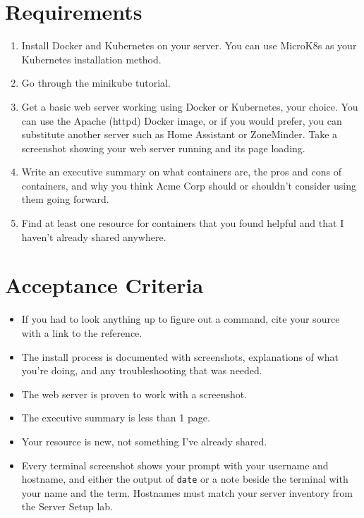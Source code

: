 \documentclass[12pt]{article}
\begin{document}
\section*{Requirements}
\begin{enumerate}
    \item Install Docker and Kubernetes on your server. You can use MicroK8s as your Kubernetes installation method.
    \item Go through the minikube tutorial.
    \item Get a basic web server working using Docker or Kubernetes, your choice. You can use the Apache (httpd) Docker image, or if you would prefer, you can substitute another server such as Home Assistant or ZoneMinder. Take a screenshot showing your web server running and its page loading.
    \item Write an executive summary on what containers are, the pros and cons of containers, and why you think Acme Corp should or shouldn't consider using them going forward.
    \item Find at least one resource for containers that you found helpful and that I haven't already shared anywhere.
\end{enumerate}

\section*{Acceptance Criteria}
\begin{itemize}
    \item If you had to look anything up to figure out a command, cite your source with a link to the reference.
    \item The install process is documented with screenshots, explanations of what you're doing, and any troubleshooting that was needed.
    \item The web server is proven to work with a screenshot.
    \item The executive summary is less than 1 page.
    \item Your resource is new, not something I've already shared.
    \item Every terminal screenshot shows your prompt with your username and hostname, and either the output of \texttt{date} or a note beside the terminal with your name and the term. Hostnames must match your server inventory from the Server Setup lab.
\end{itemize}
\end{document}
